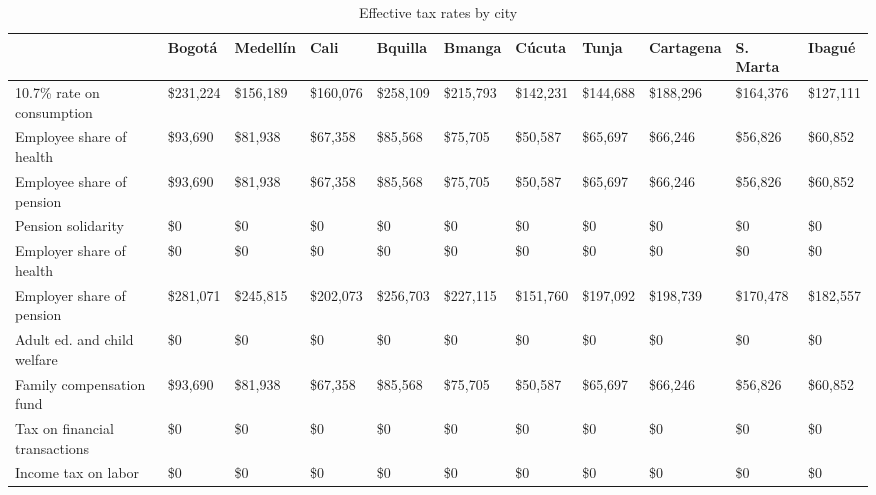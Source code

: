 \documentclass[12pt]{article}
\begin{document}
\begin{landscape}
\begin{table}[]
\caption{Effective tax rates by city}
\label{tab:tcity}
\footnotesize
\begin{tabular}{lllllllllll} \hline
& Bogot\'{a}                            & Medell\'{i}n    & Cali        & Bquilla & Bmanga & C\'{u}cuta      & Tunja       & Cartagena   & S. Marta & Ibagu\'{e}                 \\ \hline
10.7\% rate on consumption        & \$231,224   & \$156,189   & \$160,076    & \$258,109   & \$215,793   & \$142,231   & \$144,688   & \$188,296   & \$164,376   & \$127,111   \\
Employee share of health          & \$93,690    & \$81,938    & \$67,358     & \$85,568    & \$75,705    & \$50,587    & \$65,697    & \$66,246    & \$56,826    & \$60,852    \\
Employee share of pension         & \$93,690    & \$81,938    & \$67,358     & \$85,568    & \$75,705    & \$50,587    & \$65,697    & \$66,246    & \$56,826    & \$60,852    \\
Pension solidarity                & \$0         & \$0         & \$0          & \$0         & \$0         & \$0         & \$0         & \$0         & \$0         & \$0         \\
Employer share of health          & \$0         & \$0         & \$0          & \$0         & \$0         & \$0         & \$0         & \$0         & \$0         & \$0         \\
Employer share of pension         & \$281,071   & \$245,815   & \$202,073    & \$256,703   & \$227,115   & \$151,760   & \$197,092   & \$198,739   & \$170,478   & \$182,557   \\
Adult ed. and child welfare & \$0         & \$0         & \$0          & \$0         & \$0         & \$0         & \$0         & \$0         & \$0         & \$0         \\
Family compensation fund          & \$93,690    & \$81,938    & \$67,358     & \$85,568    & \$75,705    & \$50,587    & \$65,697    & \$66,246    & \$56,826    & \$60,852    \\
Tax on financial transactions     & \$0         & \$0         & \$0          & \$0         & \$0         & \$0         & \$0         & \$0         & \$0         & \$0         \\
Income tax on labor               & \$0         & \$0         & \$0          & \$0         & \$0         & \$0         & \$0         & \$0         & \$0         & \$0         \\

\end{tabular}
\end{table}
\end{landscape}
\end{document}
